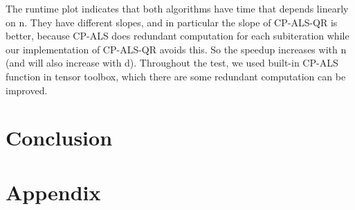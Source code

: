 \documentclass{article}
\begin{document}
The runtime plot indicates that both algorithms have time that depends linearly on n.  
They have different slopes, and in particular the slope of CP-ALS-QR is better, 
because CP-ALS does redundant computation for each subiteration while our implementation 
of CP-ALS-QR avoids this.  So the speedup increases with n (and will also increase with d).
Throughout the test, we used built-in CP-ALS function in tensor toolbox, which there are some redundant computation 
can be improved.




\section*{Conclusion}





\section*{Appendix}
\end{document}

